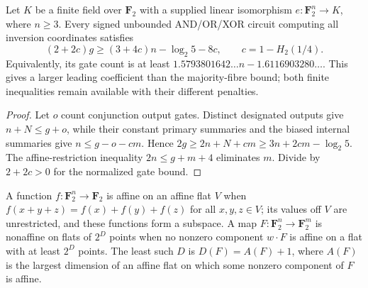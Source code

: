 \begin{theorem}
  \label{thm:lowerbounds-algebraic-geometry-inversion-feature-bound}
  \leanok
  Let $K$ be a finite field over $\mathbf F_2$ with a supplied linear
  isomorphism $e:\mathbf F_2^n\longrightarrow K$, where $n\ge3$.
  Every signed unbounded AND/OR/XOR circuit computing all inversion
  coordinates satisfies
  \[
    (2+2c)g\ge(3+4c)n-\log_2 5-8c,
    \qquad c=1-H_2(1/4).
  \]
  Equivalently, its gate count is at least
  $1.5793801642\ldots n-1.6116903280\ldots$.
  This gives a larger leading coefficient than the majority-fibre bound;
  both finite inequalities remain available with their different penalties.
\end{theorem}
\begin{proof}
  \leanok
  Let $o$ count conjunction output gates. Distinct designated outputs give
  $n+N\le g+o$, while their constant primary summaries and the biased
  internal summaries give $n\le g-o-cm$. Hence
  $2g\ge2n+N+cm\ge3n+2cm-\log_2 5$.
  The affine-restriction inequality $2n\le g+m+4$ eliminates $m$.
  Divide by $2+2c>0$ for the normalized gate bound.
\end{proof}

\begin{definition}
  \label{def:lowerbounds-algebraic-geometry-restriction-rank}
  \leanok
  A function $f:\mathbf F_2^n\to\mathbf F_2$ is affine on an affine flat $V$ when
  $f(x+y+z)=f(x)+f(y)+f(z)$ for all $x,y,z\in V$; its values off $V$ are
  unrestricted, and these functions form a subspace. A map
  $F:\mathbf F_2^n\to\mathbf F_2^m$ is nonaffine on flats of $2^D$ points when no
  nonzero component $w\cdot F$ is affine on a flat with at least $2^D$ points.
  The least such $D$ is $D(F)=A(F)+1$, where $A(F)$ is the largest dimension of an
  affine flat on which some nonzero component of $F$ is affine.
\end{definition}

